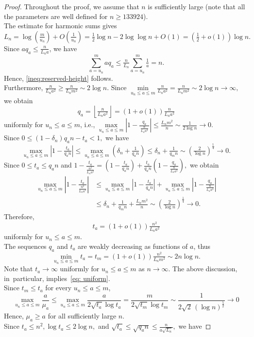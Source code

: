 \documentclass[12pt,a4paper]{amsart}
\numberwithin{equation}{section}
\theoremstyle{plain}
\theoremstyle{definition}
\theoremstyle{remark}
\begin{document}
\begin{proof}
Throughout the proof, we assume that $n$ is sufficiently large
(note that all the parameters are well defined for $n\ge 133924$).\\
The estimate for harmonic sums gives
$$
L_n
=
\log\left(\tfrac{m}{u_n}\right)
+
O\left(\tfrac1{u_n}\right)
=
\tfrac12\log n
-
2\log\log n
+
O(1)
=
\left(\tfrac12+o(1)\right)\log n.
$$
Since $a q_a\le \tfrac{n}{L_na}$, we have
$$
\sum_{a=u_n}^{m}a q_a
\le 
\tfrac{n}{L_n}\sum_{a=u_n}^{m}\tfrac1a
=
n.
$$
Hence, \eqref{ineq:reserved-height} follows.\\
Furthermore, $\tfrac{n}{L_na^2}\ge \tfrac{n}{L_nm^2}\sim 2\log n$. 
Since
$
\min\limits_{u_n\le  a\le m}\frac{n}{L_na^2}
=
\frac{n}{L_nm^2}
\sim
2\log n\to\infty,
$
we obtain
$$
q_a=\left\lfloor\tfrac{n}{L_na^2}\right\rfloor
=
\left(1+o(1)\right)\tfrac{n}{L_na^2}
$$
uniformly for $u_n\le  a\le  m$, i.e.,
$
\max\limits_{u_n\le a\le m}
\left|
1-\frac{q_a}{\,\frac{n}{L_na^2}\,}
\right|
\le
\frac{L_nm^2}{n}
\sim
\frac{1}{2\log n}
\longrightarrow0.
$\\
Since
$
0\le (1-\delta_n)q_an-t_a<1,
$
we have
$$
\max\limits_{u_n\le  a\le  m}
\left|
1-\tfrac{t_a}{q_an}
\right|
\le \max\limits_{u_n\le  a\le m}\left(\delta_n+\tfrac1{q_an}\right)\le
\delta_n+\tfrac{1}{q_mn}
\sim
\left(\tfrac{2}{\log n}\right)^{\tfrac{1}{4}}
 \longrightarrow 0.
$$
Since $0\le  t_a\le  q_an$ and
$
1-\frac{t_a}{\frac{n^2}{L_na^2}}
=
\left(1-\frac{t_a}{q_an}\right)
+
\frac{t_a}{q_an}
\left(
1-\frac{q_a}{\frac{n}{L_na^2}}
\right),
$
we obtain
\begin{align*}
    \max_{u_n\le  a\le  m}
\left|
1-\frac{t_a}{\frac{n^2}{L_na^2}}
\right|
&\le 
\max_{u_n\le  a\le  m}
\left|
1-\frac{t_a}{q_an}
\right|
+
\max_{u_n\le  a\le  m}
\left|
1-\frac{q_a}{\frac{n}{L_na^2}}
\right|\\
&\le
\delta_n+\tfrac{1}{q_mn}
+\tfrac{L_nm^2}{n}
\sim
\left(\tfrac{2}{\log n}\right)^{\frac{1}{4}}
\longrightarrow0.
\end{align*}
Therefore,
$$
t_a=(1+o(1))\tfrac{n^2}{L_na^2}
$$
uniformly for $u_n\le  a\le m$.\\
The sequences $q_a$ and $t_a$ are weakly decreasing as functions of $a$, thus
$$
\min_{u_n\le  a\le  m}t_a
=
t_m
=
(1+o(1))\tfrac{n^2}{L_nm^2}
\sim
2n\log n.
$$
Note that $t_a\to\infty$ uniformly for $u_n\le  a\le  m$ as $n\to\infty$.
The above discussion, in~particular, implies~\eqref{eq: uniform}.\\
Since $t_m\le  t_a$ for every $u_n\le  a\le  m$,
$$
\max\limits_{u_n\le  a\le  m}
\frac{a}{\mu_a}
\le 
\max\limits_{u_n\le  a\le  m}
\frac{a}{2\sqrt{t_a}\log t_a}
=
\frac{m}{2\sqrt{t_m}\log t_m}
\sim
\frac{1}{2\sqrt2\,(\log n)^{\frac{5}{2}}}
\longrightarrow0
$$
Hence, $\mu_a\geq a$ for all sufficiently large $n$.\\
Since
$t_a\le  n^2, \log t_a\le 2\log n,$
and
$\sqrt{t_a}\le\sqrt{q_an}\le\frac{n}{a\sqrt{L_n}},$
we have


\end{proof}
\end{document}
